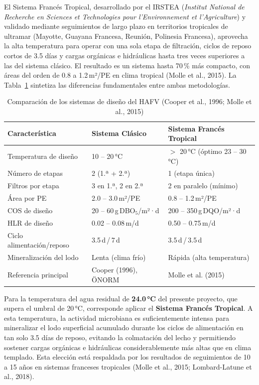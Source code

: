 El Sistema Francés Tropical, desarrollado por el IRSTEA (\textit{Institut National de Recherche en Sciences et Technologies pour l'Environnement et l'Agriculture}) y validado mediante seguimientos de largo plazo en territorios tropicales de ultramar (Mayotte, Guayana Francesa, Reunión, Polinesia Francesa), aprovecha la alta temperatura para operar con una sola etapa de filtración, ciclos de reposo cortos de 3.5 días y cargas orgánicas e hidráulicas hasta tres veces superiores a las del sistema clásico. El resultado es un sistema hasta 70\,\% más compacto, con áreas del orden de 0.8 a 1.2\,m²/PE en clima tropical (Molle et al., 2015). La Tabla~\ref{tab:comparacion_sistemas} sintetiza las diferencias fundamentales entre ambas metodologías.

\begin{table}[H]
\centering
\caption{Comparación de los sistemas de diseño del HAFV (Cooper et al., 1996; Molle et al., 2015)}
\label{tab:comparacion_sistemas}
\begin{tabular}{p{4.8cm}p{4.2cm}p{4.2cm}}
\toprule
\textbf{Característica} & \textbf{Sistema Clásico} & \textbf{Sistema Francés Tropical} \\
\midrule
Temperatura de diseño & 10 -- 20\,°C & $>$ 20\,°C (óptimo 23 -- 30\,°C) \\
Número de etapas & 2 (1.ª + 2.ª) & 1 (etapa única) \\
Filtros por etapa & 3 en 1.ª, 2 en 2.ª & 2 en paralelo (mínimo) \\
Área por PE & 2.0 -- 3.0\,m²/PE & 0.8 -- 1.2\,m²/PE \\
COS de diseño & 20 -- 60\,g\,DBO$_5$/m²·d & 200 -- 350\,g\,DQO/m²·d \\
HLR de diseño & 0.02 -- 0.08\,m/d & 0.50 -- 0.75\,m/d \\
Ciclo alimentación/reposo & 3.5\,d\,/\,7\,d & 3.5\,d\,/\,3.5\,d \\
Mineralización del lodo & Lenta (clima frío) & Rápida (alta temperatura) \\
Referencia principal & Cooper (1996), ÖNORM & Molle et al. (2015) \\
\bottomrule
\end{tabular}
\end{table}

Para la temperatura del agua residual de \textbf{24.0\,°C} del presente proyecto, que supera el umbral de 20\,°C, corresponde aplicar el \textbf{Sistema Francés Tropical}. A esta temperatura, la actividad microbiana es suficientemente intensa para mineralizar el lodo superficial acumulado durante los ciclos de alimentación en tan solo 3.5 días de reposo, evitando la colmatación del lecho y permitiendo sostener cargas orgánicas e hidráulicas considerablemente más altas que en clima templado. Esta elección está respaldada por los resultados de seguimientos de 10 a 15 años en sistemas franceses tropicales (Molle et al., 2015; Lombard-Latune et al., 2018).

